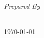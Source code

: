 \begin{titlepage}
  \begin{center}

    \newCommandProposalParty \\
    \textsc{\Large \newCommandProposalId}\\[0.5cm]

    \HRule\\[0.4cm]
    {\huge \bfseries \newCommandProposalTitle \\[0.4cm]}
    \HRule\\[1.5cm]

    \emph{Prepared By}\\[0.1cm]
    \noindent{}\\[1cm]

    \vfill

    {\large \today}

  \end{center}
\end{titlepage}
